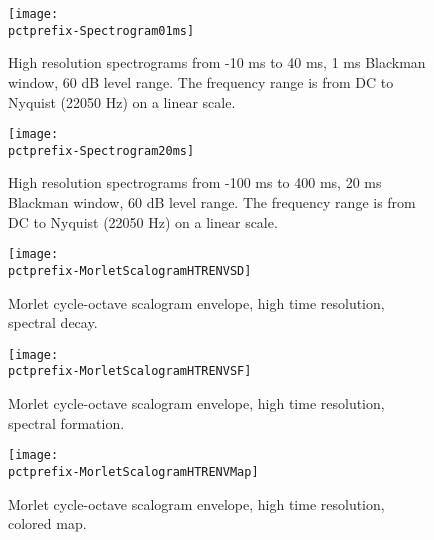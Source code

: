 \documentclass[a4paper,titlepage]{article}
\newcommand{\pctprefix}{T}
\newcommand{\pctwidth}{1.0}
\begin{document}
\begin{figure}
\begin{minipage}{\textwidth}
\begin{center}
\texttt{[image: \\pctprefix-Spectrogram01ms]}
\caption{High   resolution   spectrograms  from  -10 ms  to 40  ms, 1 ms
Blackman window,  60 dB level range.  The frequency  range is from DC to
Nyquist (22050 Hz) on a linear scale.}
\end{center}
\end{minipage}
\end{figure}

\begin{figure}
\begin{minipage}{\textwidth}
\begin{center}
\texttt{[image: \\pctprefix-Spectrogram20ms]}
\caption{High  resolution  spectrograms  from  -100 ms to 400  ms, 20 ms
Blackman window,  60 dB level range.  The frequency  range is from DC to
Nyquist (22050 Hz) on a linear scale.}
\end{center}
\end{minipage}
\end{figure}

\clearpage

\begin{figure}
\begin{center}
\texttt{[image: \\pctprefix-MorletScalogramHTRENVSD]}
\caption{Morlet cycle-octave scalogram envelope, high time resolution, spectral decay.}
\end{center}
\end{figure}

\begin{figure}
\begin{center}
\texttt{[image: \\pctprefix-MorletScalogramHTRENVSF]}
\caption{Morlet cycle-octave scalogram envelope, high time resolution, spectral formation.}
\end{center}
\end{figure}

\begin{figure}
\begin{center}
\texttt{[image: \\pctprefix-MorletScalogramHTRENVMap]}
\caption{Morlet cycle-octave scalogram envelope, high time resolution, colored map.}
\end{center}
\end{figure}
\end{document}
